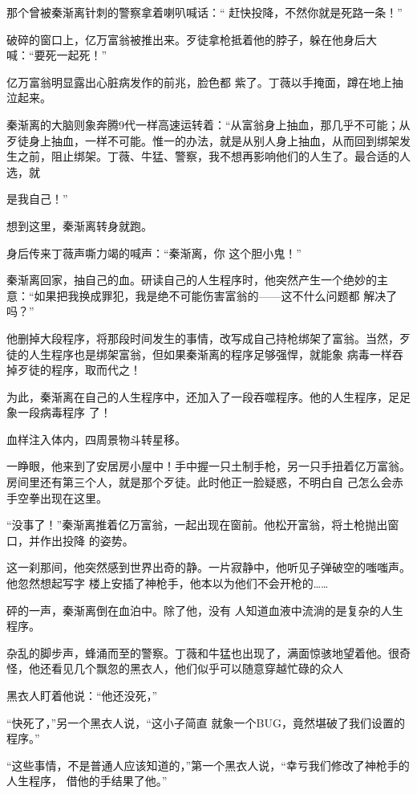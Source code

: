 \documentclass{article}
\begin{document}
那个曾被秦渐离针刺的警察拿着喇叭喊话：“
赶快投降，不然你就是死路一条！” 

破碎的窗口上，亿万富翁被推出来。歹徒拿枪抵着他的脖子，躲在他身后大喊：“要死一起死！”

亿万富翁明显露出心脏病发作的前兆，脸色都
紫了。丁薇以手掩面，蹲在地上抽泣起来。 

秦渐离的大脑则象奔腾9代一样高速运转着：“从富翁身上抽血，那几乎不可能；从歹徒身上抽血，一样不可能。惟一的办法，就是从别人身上抽血，从而回到绑架发生之前，阻止绑架。丁薇、牛猛、警察，我不想再影响他们的人生了。最合适的人选，就

\newpage
是我自己！” 


想到这里，秦渐离转身就跑。 

身后传来丁薇声嘶力竭的喊声：“秦渐离，你
这个胆小鬼！” 

秦渐离回家，抽自己的血。研读自己的人生程序时，他突然产生一个绝妙的主意：“如果把我换成罪犯，我是绝不可能伤害富翁的——这不什么问题都
解决了吗？” 

他删掉大段程序，将那段时间发生的事情，改写成自己持枪绑架了富翁。当然，歹徒的人生程序也是绑架富翁，但如果秦渐离的程序足够强悍，就能象
病毒一样吞掉歹徒的程序，取而代之！ 

为此，秦渐离在自己的人生程序中，还加入了一段吞噬程序。他的人生程序，足足象一段病毒程序
了！ 


\newpage

血样注入体内，四周景物斗转星移。 

一睁眼，他来到了安居房小屋中！手中握一只土制手枪，另一只手扭着亿万富翁。房间里还有第三个人，就是那个歹徒。此时他正一脸疑惑，不明白自
己怎么会赤手空拳出现在这里。 

“没事了！”秦渐离推着亿万富翁，一起出现在窗前。他松开富翁，将土枪抛出窗口，并作出投降
的姿势。 

这一刹那间，他突然感到世界出奇的静。一片寂静中，他听见子弹破空的嗤嗤声。他忽然想起写字
楼上安插了神枪手，他本以为他们不会开枪的…… 

砰的一声，秦渐离倒在血泊中。除了他，没有
人知道血液中流淌的是复杂的人生程序。 

杂乱的脚步声，蜂涌而至的警察。丁薇和牛猛也出现了，满面惊骇地望着他。很奇怪，他还看见几个飘忽的黑衣人，他们似乎可以随意穿越忙碌的众人

\newpage


黑衣人盯着他说：“他还没死，” 

“快死了，”另一个黑衣人说，“这小子简直
就象一个BUG，竟然堪破了我们设置的程序。” 

“这些事情，不是普通人应该知道的，”第一个黑衣人说，“幸亏我们修改了神枪手的人生程序，
借他的手结果了他。” 
\end{document}
